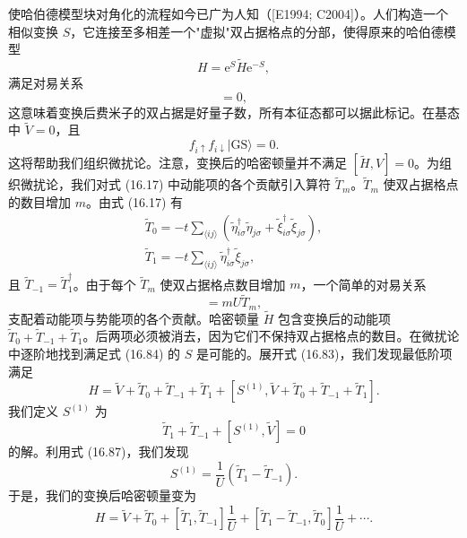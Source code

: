 使哈伯德模型块对角化的流程如今已广为人知（[E1994; C2004]）。人们构造一个相似变换 $S$，它连接至多相差一个"虚拟"双占据格点的分部，使得原来的哈伯德模型
\begin{equation*}
H=\mathrm{e}^{S}\tilde{H}\mathrm{e}^{-S},\tag{16.83}
\end{equation*}
满足对易关系
\begin{equation*}
[H,\tilde{V}]=0,\tag{16.84}
\end{equation*}
这意味着变换后费米子的双占据是好量子数，所有本征态都可以据此标记。在基态中 $\tilde{V}=0$，且
\begin{equation*}
f_{i\uparrow}f_{i\downarrow}|\mathrm{GS}\rangle=0.\tag{16.85}
\end{equation*}
这将帮助我们组织微扰论。注意，变换后的哈密顿量并不满足 $[\tilde{H},V]=0$。为组织微扰论，我们对式 (16.17) 中动能项的各个贡献引入算符 $\tilde{T}_{m}$。$\tilde{T}_{m}$ 使双占据格点的数目增加 $m$。由式 (16.17) 有
\begin{align*}
\tilde{T}_{0}=-t\sum_{\langle ij\rangle}\left(\tilde{\eta}^{\dagger}_{i\sigma}\tilde{\eta}_{j\sigma}+\tilde{\xi}^{\dagger}_{i\sigma}\tilde{\xi}_{j\sigma}\right),\\
\tilde{T}_{1}=-t\sum_{\langle ij\rangle}\tilde{\eta}^{\dagger}_{i\sigma}\tilde{\xi}_{j\sigma},\tag{16.86}
\end{align*}
且 $\tilde{T}_{-1}=\tilde{T}^{\dagger}_{1}$。由于每个 $\tilde{T}_{m}$ 使双占据格点数目增加 $m$，一个简单的对易关系
\begin{equation*}
[\tilde{V},\tilde{T}_{m}]=mU\tilde{T}_{m},\tag{16.87}
\end{equation*}
支配着动能项与势能项的各个贡献。哈密顿量 $\tilde{H}$ 包含变换后的动能项 $\tilde{T}_{0}+\tilde{T}_{-1}+\tilde{T}_{1}$。后两项必须被消去，因为它们不保持双占据格点的数目。在微扰论中逐阶地找到满足式 (16.84) 的 $S$ 是可能的。展开式 (16.83)，我们发现最低阶项满足
\begin{equation*}
H=\tilde{V}+\tilde{T}_{0}+\tilde{T}_{-1}+\tilde{T}_{1}+[S^{(1)},\tilde{V}+\tilde{T}_{0}+\tilde{T}_{-1}+\tilde{T}_{1}].\tag{16.88}
\end{equation*}
我们定义 $S^{(1)}$ 为
\begin{equation*}
\tilde{T}_{1}+\tilde{T}_{-1}+[S^{(1)},\tilde{V}]=0\tag{16.89}
\end{equation*}
的解。利用式 (16.87)，我们发现
\begin{equation*}
S^{(1)}=\frac{1}{U}\left(\tilde{T}_{1}-\tilde{T}_{-1}\right).\tag{16.90}
\end{equation*}
于是，我们的变换后哈密顿量变为
\begin{equation*}
H=\tilde{V}+\tilde{T}_{0}+[\tilde{T}_{1},\tilde{T}_{-1}]\frac{1}{U}+[\tilde{T}_{1}-\tilde{T}_{-1},\tilde{T}_{0}]\frac{1}{U}+\cdots.\tag{16.91}
\end{equation*}
